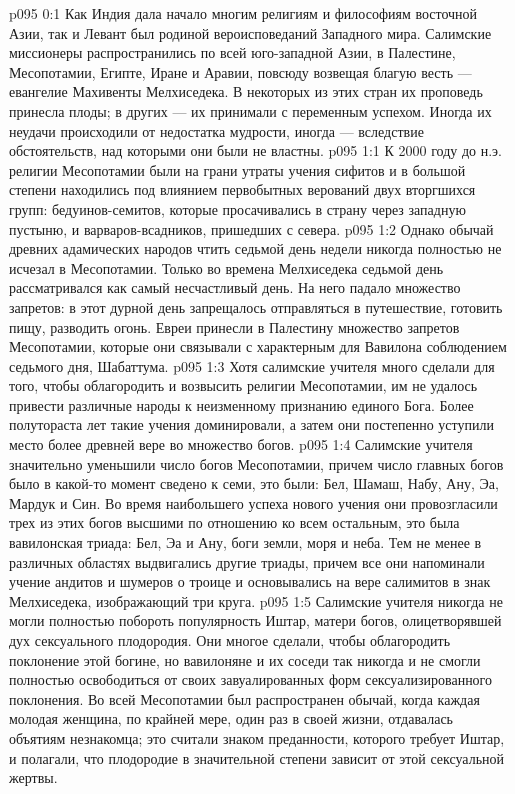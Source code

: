 \author{Мелхиседек}
\vs p095 0:1 Как Индия дала начало многим религиям и философиям восточной Азии, так и Левант был родиной вероисповеданий Западного мира. Салимские миссионеры распространились по всей юго\hyp{}западной Азии, в Палестине, Месопотамии, Египте, Иране и Аравии, повсюду возвещая благую весть --- евангелие Махивенты Мелхиседека. В некоторых из этих стран их проповедь принесла плоды; в других --- их принимали с переменным успехом. Иногда их неудачи происходили от недостатка мудрости, иногда --- вследствие обстоятельств, над которыми они были не властны.
\vs p095 1:1 К 2000 году до н.э. религии Месопотамии были на грани утраты учения сифитов и в большой степени находились под влиянием первобытных верований двух вторгшихся групп: бедуинов\hyp{}семитов, которые просачивались в страну через западную пустыню, и варваров\hyp{}всадников, пришедших с севера.
\vs p095 1:2 Однако обычай древних адамических народов чтить седьмой день недели никогда полностью не исчезал в Месопотамии. Только во времена Мелхиседека седьмой день рассматривался как самый несчастливый день. На него падало множество запретов: в этот дурной день запрещалось отправляться в путешествие, готовить пищу, разводить огонь. Евреи принесли в Палестину множество запретов Месопотамии, которые они связывали с характерным для Вавилона соблюдением седьмого дня, Шабаттума.
\vs p095 1:3 Хотя салимские учителя много сделали для того, чтобы облагородить и возвысить религии Месопотамии, им не удалось привести различные народы к неизменному признанию единого Бога. Более полутораста лет такие учения доминировали, а затем они постепенно уступили место более древней вере во множество богов.
\vs p095 1:4 Салимские учителя значительно уменьшили число богов Месопотамии, причем число главных богов было в какой\hyp{}то момент сведено к семи, это были: Бел, Шамаш, Набу, Ану, Эа, Мардук и Син. Во время наибольшего успеха нового учения они провозгласили трех из этих богов высшими по отношению ко всем остальным, это была вавилонская триада: Бел, Эа и Ану, боги земли, моря и неба. Тем не менее в различных областях выдвигались другие триады, причем все они напоминали учение андитов и шумеров о троице и основывались на вере салимитов в знак Мелхиседека, изображающий три круга.
\vs p095 1:5 Салимские учителя никогда не могли полностью побороть популярность Иштар, матери богов, олицетворявшей дух сексуального плодородия. Они многое сделали, чтобы облагородить поклонение этой богине, но вавилоняне и их соседи так никогда и не смогли полностью освободиться от своих завуалированных форм сексуализированного поклонения. Во всей Месопотамии был распространен обычай, когда каждая молодая женщина, по крайней мере, один раз в своей жизни, отдавалась объятиям незнакомца; это считали знаком преданности, которого требует Иштар, и полагали, что плодородие в значительной степени зависит от этой сексуальной жертвы.
